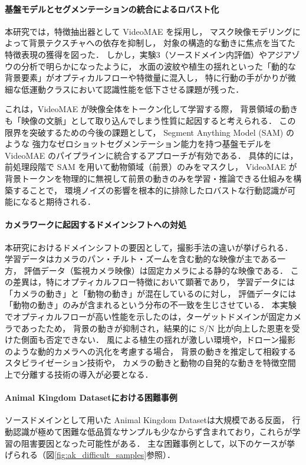 \paragraph{基盤モデルとセグメンテーションの統合によるロバスト化}
本研究では，特徴抽出器として VideoMAE を採用し，
マスク映像モデリングによって背景テクスチャへの依存を抑制し，
対象の構造的な動きに焦点を当てた特徴表現の獲得を図った．
しかし，実験3（ソースドメイン内評価）やアジアゾウの分析で明らかになったように，
水面の波紋や植生の揺れといった「動的な背景要素」がオプティカルフローや特徴量に混入し，
特に行動の手がかりが微細な低運動クラスにおいて認識性能を低下させる課題が残った．

これは，VideoMAE が映像全体をトークン化して学習する際，
背景領域の動きも「映像の文脈」として取り込んでしまう性質に起因すると考えられる．
この限界を突破するための今後の課題として，
Segment Anything Model (SAM) \cite{kirillov2023segment}  のような
強力なゼロショットセグメンテーション能力を持つ基盤モデルを VideoMAE のパイプラインに統合するアプローチが有効である．
具体的には，前処理段階で SAM を用いて動物領域（前景）のみをマスクし，
VideoMAE が背景トークンを物理的に無視して前景の動きのみを学習・推論できる仕組みを構築することで，
環境ノイズの影響を根本的に排除したロバストな行動認識が可能になると期待される．

\paragraph{カメラワークに起因するドメインシフトへの対処}
本研究におけるドメインシフトの要因として，撮影手法の違いが挙げられる．
学習データはカメラのパン・チルト・ズームを含む動的な映像が主である一方，
評価データ（監視カメラ映像）は固定カメラによる静的な映像である．
この差異は，特にオプティカルフロー特徴において顕著であり，
学習データには「カメラの動き」と「動物の動き」が混在しているのに対し，
評価データには「動物の動き」のみが含まれるという分布の不一致を生じさせている．
本実験でオプティカルフローが高い性能を示したのは，ターゲットドメインが固定カメラであったため，
背景の動きが抑制され，結果的に S/N 比が向上した恩恵を受けた側面も否定できない．
風による植生の揺れが激しい環境や，ドローン撮影のような動的カメラへの汎化を考慮する場合，
背景の動きを推定して相殺するスタビライゼーション技術や，
カメラの動きと動物の自発的な動きを特徴空間上で分離する技術の導入が必要となる．


\paragraph{Animal Kingdom Datasetにおける困難事例}
ソースドメインとして用いた Animal Kingdom Datasetは大規模である反面，
行動認識が極めて困難な低品質なサンプルも少なからず含まれており，これらが学習の阻害要因となった可能性がある．
主な困難事例として，以下のケースが挙げられる（図\ref{fig:ak_difficult_samples}参照）．

